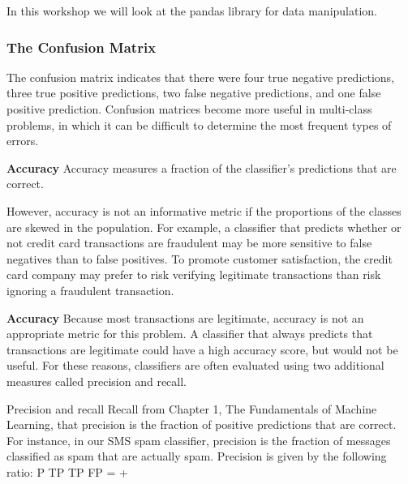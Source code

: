 
\begin{frame}
\frametitle{Confusion Matrix

\end{frame}

In this workshop we will look at the pandas library for data manipulation.


\begin{frame}
\frametitle{The Confusion Matrix}
The confusion matrix indicates that there were four true negative predictions, three
true positive predictions, two false negative predictions, and one false positive
prediction. Confusion matrices become more useful in multi-class problems, in
which it can be difficult to determine the most frequent types of errors.
\end{frame}
\begin{frame}
\textbf{Accuracy}
Accuracy measures a fraction of the classifier's predictions that are correct.

However, accuracy is not an informative metric if the proportions of
the classes are skewed in the population. For example, a classifier that predicts
whether or not credit card transactions are fraudulent may be more sensitive to
false negatives than to false positives. To promote customer satisfaction, the credit
card company may prefer to risk verifying legitimate transactions than risk ignoring
a fraudulent transaction. 
\end{frame}
\begin{frame}
\textbf{Accuracy}
Because most transactions are legitimate, accuracy is
not an appropriate metric for this problem. A classifier that always predicts that
transactions are legitimate could have a high accuracy score, but would not be
useful. For these reasons, classifiers are often evaluated using two additional
measures called precision and recall.
\end{frame}
\begin{frame}
Precision and recall
Recall from Chapter 1, The Fundamentals of Machine Learning, that precision is the
fraction of positive predictions that are correct. For instance, in our SMS spam
classifier, precision is the fraction of messages classified as spam that are actually
spam. Precision is given by the following ratio:
P TP
TP FP
=
+
\end{frame}
